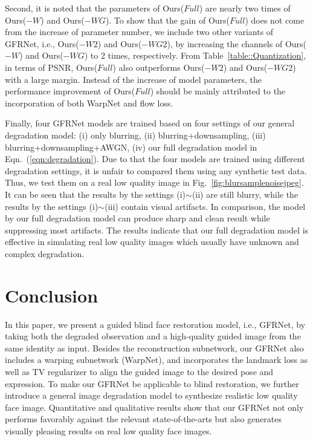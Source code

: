 \documentclass[runningheads]{llncs}
\begin{document}
Second, it is noted that the parameters of Ours($Full$) are nearly two times of Ours($-W$) and Ours($-WG$).
To show that the gain of Ours($Full$) does not come from the increase of parameter number, we include two other variants of GFRNet, i.e., Ours($-W2$) and Ours($-WG2$), by increasing the channels of Ours($-W$) and Ours($-WG$) to 2 times, respectively.
From Table~\ref{table::Quantization}, in terms of PSNR, Ours($Full$) also outperforms Ours($-W2$) and Ours($-WG2$) with a large margin.
Instead of the increase of model parameters, the performance improvement of Ours($Full$) should be mainly attributed to the incorporation of both WarpNet and flow loss.


Finally, four GFRNet models are trained based on four settings of our general degradation model: (i) only blurring, (ii) blurring+downsampling, (iii) blurring+downsampling+AWGN, (iv) our full degradation model in Eqn.~(\ref{eqn:degradation}).
Due to that the four models are trained using different degradation settings, it is unfair to compared them using any synthetic test data.
Thus, we test them on a real low quality image in Fig.~\ref{fig:blursamplenoisejpeg}.
It can be seen that the results by the settings (i)$\sim$(ii) are still blurry, while the results by the settings {(i)$\sim$(iii)} contain visual artifacts.
In comparison, the model by our full degradation model can produce sharp and clean result while suppressing most artifacts.
The results indicate that our full degradation model is effective in simulating real low quality images which usually have unknown and complex degradation.

\section{Conclusion}\label{section5}
In this paper, we present a guided blind face restoration model, i.e., GFRNet, by taking both the degraded observation and a high-quality guided image from the same identity as input.
Besides the reconstruction subnetwork, our GFRNet also includes a warping subnetwork (WarpNet), and incorporates the landmark loss as well as TV regularizer to align the guided image to the desired pose and expression.
To make our GFRNet be applicable to blind restoration, we further introduce a general image degradation model to synthesize realistic low quality face image.
Quantitative and qualitative results show that our GFRNet not only performs favorably against the relevant state-of-the-arts but also generates visually pleasing results on real low quality face images.
\clearpage


\end{document}
